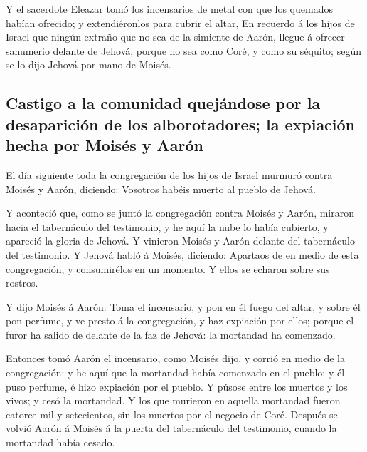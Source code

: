  Y el sacerdote Eleazar tomó los incensarios de metal con
que los quemados habían ofrecido; y extendiéronlos para cubrir el altar,
 En recuerdo á los hijos de Israel que ningún extraño que
no sea de la simiente de Aarón, llegue á ofrecer sahumerio delante de
Jehová, porque no sea como Coré, y como su séquito; según se lo dijo
Jehová por mano de Moisés.

\hypertarget{castigo-a-la-comunidad-quejuxe1ndose-por-la-desapariciuxf3n-de-los-alborotadores-la-expiaciuxf3n-hecha-por-moisuxe9s-y-aaruxf3n}{%
\subsection{Castigo a la comunidad quejándose por la desaparición de los
alborotadores; la expiación hecha por Moisés y
Aarón}\label{castigo-a-la-comunidad-quejuxe1ndose-por-la-desapariciuxf3n-de-los-alborotadores-la-expiaciuxf3n-hecha-por-moisuxe9s-y-aaruxf3n}}

 El día siguiente toda la congregación de los hijos de
Israel murmuró contra Moisés y Aarón, diciendo: Vosotros habéis muerto
al pueblo de Jehová.

 Y aconteció que, como se juntó la congregación contra
Moisés y Aarón, miraron hacia el tabernáculo del testimonio, y he aquí
la nube lo había cubierto, y apareció la gloria de Jehová. 
Y vinieron Moisés y Aarón delante del tabernáculo del testimonio.
 Y Jehová habló á Moisés, diciendo:  Apartaos
de en medio de esta congregación, y consumirélos en un momento. Y ellos
se echaron sobre sus rostros.

 Y dijo Moisés á Aarón: Toma el incensario, y pon en él
fuego del altar, y sobre él pon perfume, y ve presto á la congregación,
y haz expiación por ellos; porque el furor ha salido de delante de la
faz de Jehová: la mortandad ha comenzado.

 Entonces tomó Aarón el incensario, como Moisés dijo, y
corrió en medio de la congregación: y he aquí que la mortandad había
comenzado en el pueblo: y él puso perfume, é hizo expiación por el
pueblo.  Y púsose entre los muertos y los vivos; y cesó la
mortandad.  Y los que murieron en aquella mortandad fueron
catorce mil y setecientos, sin los muertos por el negocio de Coré.
 Después se volvió Aarón á Moisés á la puerta del
tabernáculo del testimonio, cuando la mortandad había cesado.

